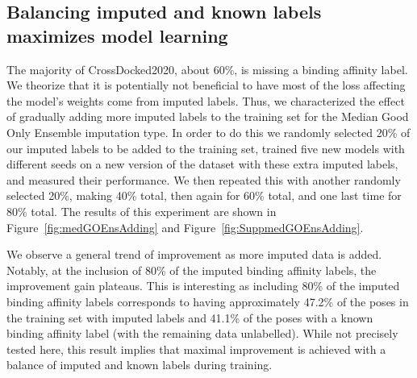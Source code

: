 \documentclass[journal=jcim,manuscript=article]{achemso}
\begin{document}
\subsection{Balancing imputed and known labels maximizes model learning}
The majority of CrossDocked2020, about 60\%, is missing a binding affinity label.
We theorize that it is potentially not beneficial to have most of the loss affecting the model's weights come from imputed labels.
Thus, we characterized the effect of gradually adding more imputed labels to the training set for the Median Good Only Ensemble imputation type.
In order to do this we randomly selected 20\% of our imputed labels to be added to the training set, trained five new models with different seeds on a new version of the dataset with these extra imputed labels, and measured their performance.
We then repeated this with another randomly selected 20\%, making 40\% total, then again for 60\% total, and one last time for 80\% total.
The results of this experiment are shown in Figure~\ref{fig:medGOEnsAdding} and Figure~\ref{fig:SuppmedGOEnsAdding}.

We observe a general trend of improvement as more imputed data is added.
Notably, at the inclusion of 80\% of the imputed binding affinity labels, the improvement gain plateaus.
This is interesting as including 80\% of the imputed binding affinity labels corresponds to having approximately 47.2\% of the poses in the training set with imputed labels and 41.1\% of the poses with a known binding affinity label (with the remaining data unlabelled).
While not precisely tested here, this result implies that maximal improvement is achieved with a balance of imputed and known labels during training.
\end{document}
